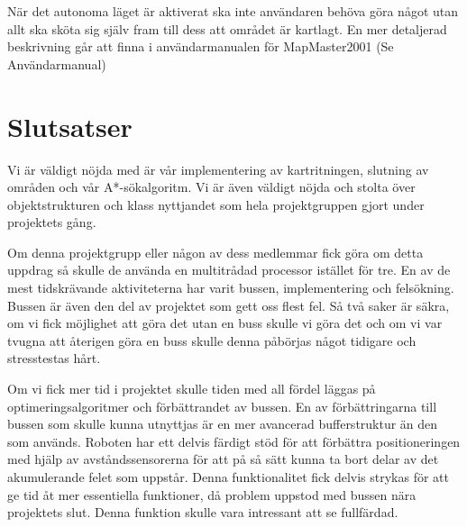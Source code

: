 \documentclass[a4paper,12pt,fleqn]{article}
\begin{document}
När det autonoma läget är aktiverat ska inte användaren behöva göra något utan allt ska sköta sig själv fram till dess att området är kartlagt. En mer detaljerad beskrivning går att finna i användarmanualen för MapMaster2001 (Se Användarmanual)




\section{Slutsatser}




Vi är väldigt nöjda med är vår implementering av kartritningen, slutning av områden och vår A*-sökalgoritm. Vi är även väldigt nöjda och stolta över objektstrukturen och klass nyttjandet som hela projektgruppen gjort under projektets gång.



Om denna projektgrupp eller någon av dess medlemmar fick göra om detta uppdrag så skulle de använda en multitrådad processor istället för tre. En av de mest tidskrävande aktiviteterna har varit bussen, implementering och felsökning. Bussen är även den del av projektet som gett oss flest fel. Så två saker är säkra, om vi fick möjlighet att göra det utan en buss skulle vi göra det och om vi var tvugna att återigen göra en buss skulle denna påbörjas något tidigare och stresstestas hårt.


Om vi fick mer tid i projektet skulle tiden med all fördel läggas på optimeringsalgoritmer och förbättrandet av bussen. En av förbättringarna till bussen som skulle kunna utnyttjas är en mer avancerad bufferstruktur än den som används.
Roboten har ett delvis färdigt stöd för att förbättra positioneringen med hjälp av avståndssensorerna för att på så sätt kunna ta bort delar av det akumulerande felet som uppstår. Denna funktionalitet fick delvis strykas för att ge tid åt mer essentiella funktioner, då problem uppstod med bussen nära projektets slut. Denna funktion skulle vara intressant att se fullfärdad.  
\end{document}
